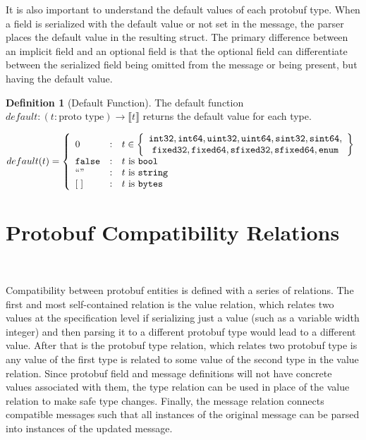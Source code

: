 \documentclass[11pt]{article}
\theoremstyle{definition}
\newtheorem{definition}{Definition}[section]
\theoremstyle{plain}
\begin{document}
It is also important to understand the default values of each protobuf
type. When a field is serialized with the default value or not set in the
message, the parser places the default value in the resulting struct. The
primary difference between an implicit field and an optional field is that the
optional field can differentiate between the serialized field being omitted from
the message or being present, but having the default value.
\\
\begin{definition}[Default Function]
  The default function
  $default: (t:\text{proto type}) \rightarrow \llbracket t \rrbracket$ returns the default
  value for each type.
  
  \[ default(t) = \left\{ 
    \begin{array}{l@{\quad:\quad}l}
      0 & t \in \left\{\begin{array}{c}
        \mathtt{int32}, \mathtt{int64}, \mathtt{uint32},
        \mathtt{uint64}, \mathtt{sint32}, \mathtt{sint64}, \\ \mathtt{fixed32},
        \mathtt{fixed64}, \mathtt{sfixed32}, \mathtt{sfixed64}, \mathtt{enum}
      \end{array}\right\} \\
      \mathtt{false} & t \text{ is } \mathtt{bool} \\
      ``" & t \text{ is } \mathtt{string} \\
      \hspace{0pt}[\;] & t \text{ is } \mathtt{bytes}
    \end{array}\right.
  \]
\end{definition}

\section{Protobuf Compatibility Relations}~\label{sec:comp-rel}

Compatibility between protobuf entities is defined with a series of
relations. The first and most self-contained relation is the value relation,
which relates two values at the specification level if serializing just a value
(such as a variable width integer) and then parsing it to a different protobuf
type would lead to a different value. After that is the protobuf type relation,
which relates two protobuf type is any value of the first type is related to
some value of the second type in the value relation. Since protobuf field and
message definitions will not have concrete values associated with them, the type
relation can be used in place of the value relation to make safe type
changes. Finally, the message relation connects compatible messages such that
all instances of the original message can be parsed into instances of the updated
message.
\end{document}
